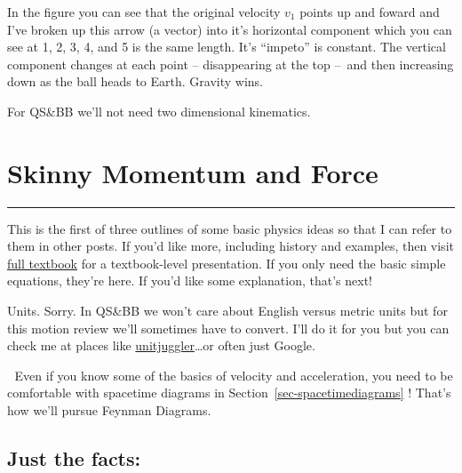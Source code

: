 \documentclass[
  letterpaper,
  DIV=11,
  numbers=noendperiod,
  oneside]{scrreprt}
\begin{document}
In the figure you can see that the original velocity \(v_1\) points up
and foward and I've broken up this arrow (a vector) into it's horizontal
component which you can see at 1, 2, 3, 4, and 5 is the same length.
It's ``impeto'' is constant. The vertical component changes at each
point -- disappearing at the top --~and then increasing down as the ball
heads to Earth. Gravity wins.

For QS\&BB we'll not need two dimensional kinematics.

\chapter{Skinny Momentum and Force}\label{skinny-momentum-and-force}

\begin{center}\rule{0.5\linewidth}{0.5pt}\end{center}

This is the first of three outlines of some basic physics ideas so that
I can refer to them in other posts. If you'd like more, including
history and examples, then visit
\href{https://qstbb.pa.msu.edu/storage/ISP220_fall2020/QS&BB2020/intro.html}{full
textbook} for a textbook-level presentation. If you only need the basic
simple equations, they're here. If you'd like some explanation, that's
next!

Units. Sorry. In QS\&BB we won't care about English versus metric units
but for this motion review we'll sometimes have to convert. I'll do it
for you but you can check me at places like
\href{https://www.unitjuggler.com/index.html}{unitjuggler}\ldots or
often just Google.

\begin{tcolorbox}[enhanced jigsaw, colbacktitle=quarto-callout-important-color!10!white, rightrule=.15mm, toptitle=1mm, arc=.35mm, breakable, left=2mm, title={Important}, colframe=quarto-callout-important-color-frame, bottomrule=.15mm, colback=white, titlerule=0mm, leftrule=.75mm, toprule=.15mm, coltitle=black, opacityback=0, opacitybacktitle=0.6, bottomtitle=1mm]

🫵 Even if you know some of the basics of velocity and acceleration, you
need to be comfortable with spacetime diagrams in
Section~\ref{sec-spacetimediagrams} ! That's how we'll pursue Feynman
Diagrams.

\end{tcolorbox}

\section{Just the facts:}\label{just-the-facts-1}
\end{document}
